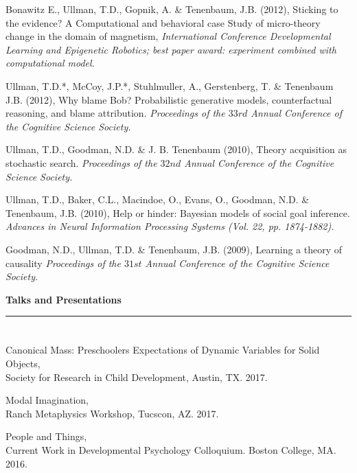\documentclass[margin,line,pifont,palatino,courier]{res}
\begin{document}
\begin{resume}
Bonawitz E., Ullman, T.D., Gopnik, A. \& Tenenbaum, J.B. (2012), Sticking to the evidence? A Computational and behavioral case Study of micro-theory change in the domain of magnetism, \textit{International Conference Developmental Learning and Epigenetic Robotics; best paper award: experiment combined with computational model.}

Ullman, T.D.*, McCoy, J.P.*, Stuhlmuller, A., Gerstenberg, T. \& Tenenbaum J.B. (2012), Why blame Bob? Probabilistic generative models, counterfactual reasoning, and blame attribution. \textit{Proceedings of the $33rd$ Annual Conference of the Cognitive Science Society.}

Ullman, T.D., Goodman, N.D. \& J. B. Tenenbaum (2010), Theory acquisition as stochastic search. \textit{Proceedings of the $32nd$ Annual Conference of the Cognitive Science Society.}

Ullman, T.D., Baker, C.L., Macindoe, O., Evans, O., Goodman, N.D. \& Tenenbaum, J.B. (2010), Help or hinder: Bayesian models of social goal inference. \textit{Advances in Neural Information Processing Systems (Vol. 22, pp. 1874-1882).}

Goodman, N.D., Ullman, T.D. \& Tenenbaum, J.B. (2009), Learning a theory of causality \textit{Proceedings of the $31st$ Annual Conference of the Cognitive Science Society.}

\vspace{20pt}
\begin{adjustwidth*}{-3.3cm}{-2cm}

\hspace{-3.8em}\textbf{Talks and Presentations}\\
\hspace*{-3.8em}\noindent\rule{8cm}{0.4pt}

\end{adjustwidth*}

\section{\sc }

Canonical Mass: Preschoolers Expectations of Dynamic Variables for Solid Objects,\\
Society for Research in Child Development, Austin, TX. 2017.

Modal Imagination,\\ Ranch Metaphysics Workshop, Tucscon, AZ. 2017.

People and Things,\\ Current Work in Developmental Psychology Colloquium. Boston College, MA. 2016. 


\end{resume}
\end{document}
